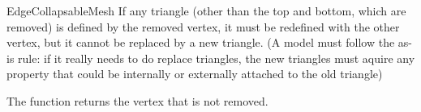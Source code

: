 \begin{ccRefConcept}{EdgeCollapsableMesh}
If any triangle (other than the top and bottom, which are removed) is defined by
the removed vertex, it must be redefined with the other vertex, but it cannot
be replaced by a new triangle. (A model must follow the as-is rule: if it really
needs to do replace triangles, the new triangles must aquire any property 
that could be internally or externally attached to the old triangle)

The function returns the vertex that is not removed.

\ccHasModels
{}\\
\\

\end{ccRefConcept}

